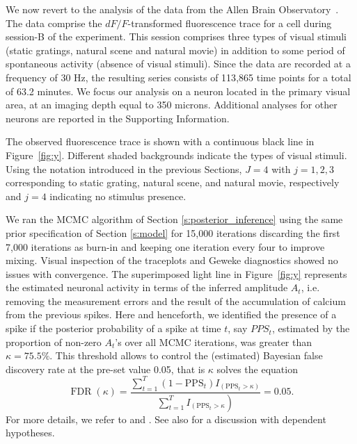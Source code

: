 We now revert to the analysis of the data from the Allen Brain Observatory~\citep{allen}. The data comprise the $dF/F$-transformed fluorescence trace for a cell during session-B of the experiment. This session comprises three types of visual stimuli (static gratings, natural scene and natural movie) in addition to some period of spontaneous activity (absence of visual stimuli). Since the data are recorded at a frequency of $30$ Hz, the resulting series consists of 113{,}865 time points for a total of 63.2 minutes. 
We focus our analysis on a neuron located in the primary visual area, at an imaging depth equal to 350 microns. Additional analyses for other neurons are reported in the Supporting Information.

The observed fluorescence trace is shown with a continuous black line in Figure~\ref{fig:y}. Different shaded backgrounds indicate the types of visual stimuli.
Using the notation introduced in the previous Sections, $J=4$ with $j=1, 2, 3$ corresponding to static grating, natural scene, and natural movie, respectively and $j=4$ indicating no stimulus presence. 


We ran the MCMC algorithm of Section \ref{s:posterior_inference} using the same prior specification of Section \ref{s:model} for 15{,}000 iterations discarding the first 7{,}000 iterations as burn-in and keeping one iteration every four to improve mixing.  Visual inspection of the traceplots and Geweke diagnostics showed no issues with convergence. 
%
The superimposed light line in Figure~\ref{fig:y} represents the estimated neuronal activity in terms of the inferred amplitude $A_t$, i.e. removing the measurement errors and the result of the accumulation of calcium from the previous spikes. Here and henceforth, we identified the presence of a spike if the  posterior probability of a spike at time $t$, say $PPS_t$, estimated by the proportion of non-zero $A_t$'s over all MCMC iterations, was greater than  $\kappa=75.5\%$. This threshold allows to control the (estimated) Bayesian false discovery rate at the pre-set value 0.05, that is $\kappa$ solves the equation $$\operatorname{FDR}\left(\kappa\right)=\frac{\sum_{t=1}^{T}\left(1-\mathrm{PPS}_{t}\right) I_{\left(\mathrm{PPS}_{t}>\kappa\right)}}{ \left.\sum_{t=1}^{T} I_{\left(\mathrm{PPS}_{t}>\kappa\right.}\right)}=0.05.$$ For more details, we refer to \citet{newton2004} and \citet{Muller07}. See also \citet{SunReich2015} for a discussion with dependent hypotheses.
%

